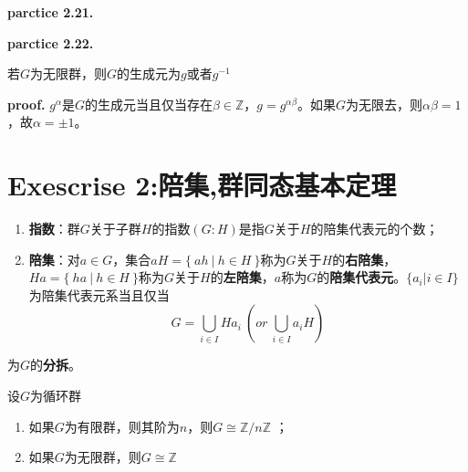\begin{mdframed}
    \textbf{parctice 2.21.} 
    \hspace*{1em}
    
\end{mdframed}

\begin{mdframed}
    \textbf{parctice 2.22.} 
    \hspace*{1em}
    
\end{mdframed}

\begin{mdframed}
    \begin{question}
        若$G$为无限群，则$G$的生成元为$g$或者$g^{-1}$
    \end{question}
    \textbf{proof.} $g^\alpha$是$G$的生成元当且仅当存在$\beta\in \mathbb{Z}$，$g=g^{\alpha\beta}$。如果$G$为无限去，则$\alpha\beta=1$，故$\alpha=\pm 1$。
\end{mdframed}

\section{Exescrise 2:陪集,群同态基本定理}

\begin{enumerate}
    \item \textbf{指数}：群$G$关于子群$H$的指数$(G:H)$是指$G$关于$H$的陪集代表元的个数；
    \item \textbf{陪集}：对$a\in G$，集合$aH=\{\ ah\ |\ h\in H\ \}$称为$G$关于$H$的\textbf{右陪集}，$Ha=\{\ ha\ |\ h\in H \ \}$称为$G$关于$H$的\textbf{左陪集}，$a$称为$G$的\textbf{陪集代表元}。$\{a_i|i\in I\}$为陪集代表元系当且仅当
    \begin{equation}
        G=\bigcup_{i\in I}Ha_i\ (or\ \bigcup_{i\in I}a_iH)
    \end{equation}
\end{enumerate}

为$G$的\textbf{分拆}。

\begin{mdframed}
    \begin{question}
        设$G$为循环群
        \begin{enumerate}[itemindent=2em]
            \item 如果$G$为有限群，则其阶为$n$，则$G\cong \mathbb{Z}/n\mathbb{Z}$ ；
            \item 如果$G$为无限群，则$G\cong \mathbb{Z}$
        \end{enumerate}
    \end{question}
\end{mdframed}

